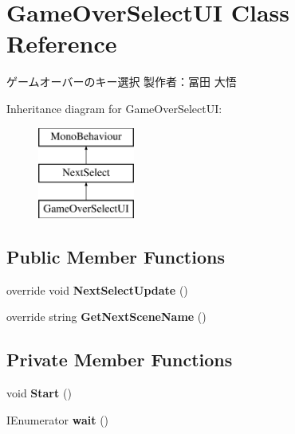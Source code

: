 \hypertarget{class_game_over_select_u_i}{}\section{Game\+Over\+Select\+UI Class Reference}
\label{class_game_over_select_u_i}


ゲームオーバーのキー選択 製作者：冨田 大悟  


Inheritance diagram for Game\+Over\+Select\+UI\+:\begin{figure}[H]
\begin{center}
\leavevmode
\includegraphics[height=3.000000cm]{class_game_over_select_u_i}
\end{center}
\end{figure}
\subsection*{Public Member Functions}
\begin{DoxyCompactItemize}
\item 
\mbox{\label{class_game_over_select_u_i_a95f0d5d50d392b67809d866a75d8634f}} 
override void {\bfseries Next\+Select\+Update} ()
\item 
\mbox{\label{class_game_over_select_u_i_a73307fc4f2d47b1f803afe2a14d679a2}} 
override string {\bfseries Get\+Next\+Scene\+Name} ()
\end{DoxyCompactItemize}
\subsection*{Private Member Functions}
\begin{DoxyCompactItemize}
\item 
\mbox{\label{class_game_over_select_u_i_afdf98acc8a48e5564f72568bdb0bd72a}} 
void {\bfseries Start} ()
\item 
\mbox{\label{class_game_over_select_u_i_a4f34e8e4e890cf543ea5028f62b2d824}} 
I\+Enumerator {\bfseries wait} ()
\end{DoxyCompactItemize}
